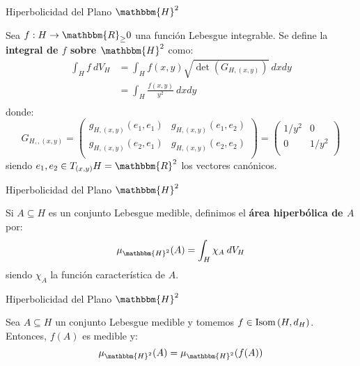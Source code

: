 \documentclass[xcolor=dvipsnames]{beamer}
\theoremstyle{largebreak}
\newcommand\cf[3]{\ensuremath{#1:#2\rightarrow#3}}
\newcommand{\bbm}[1]{\ensuremath{\mathbbm{#1}}}
\newcommand{\Isom}[1]{\ensuremath{\textup{Isom}\left(#1\right)}}
\begin{document}
\begin{frame}{Hiperbolicidad del Plano $\bbm{H}^2$}
    \begin{mydef}
        Sea $\cf{f}{H}{\bbm{R}_\geq0}$ una función Lebesgue integrable. Se define la \textbf{integral de $f$ sobre $\bbm{H}^2$} como:
        \begin{equation*}
            \begin{split}
                \int_{H}f\:dV_H&=\int_{H}f(x,y)\sqrt{\det(G_{H,(x,y)})}\:dxdy\\
                &=\int_{H}\frac{f(x,y)}{y^2}\:dxdy\\
            \end{split}
        \end{equation*}
        donde:
        \begin{equation*}
            G_{ H,,(x,y)}=\left(\begin{array}{cc}
                g_{ H,(x,y)}(e_1,e_1) & g_{ H,(x,y)}(e_1,e_2) \\
                g_{ H,(x,y)}(e_2,e_1) & g_{ H,(x,y)}(e_2,e_2) \\
            \end{array} \right)=\left(\begin{array}{cc}
                1/y^2 & 0 \\
                0 & 1/y^2 \\
            \end{array} \right)
        \end{equation*}
        siendo $e_1,e_2\in T_{(x,y)}H=\bbm{R}^2$ los vectores canónicos.
    \end{mydef}
\end{frame}

\begin{frame}{Hiperbolicidad del Plano $\bbm{H}^2$}
    \begin{mydef}
        Si $A\subseteq H$ es un conjunto Lebesgue medible, definimos el \textbf{área hiperbólica de $A$} por:
        \begin{equation*}
            \mu_{\bbm{H}^2}(A)=\int_{H}\chi_A\:dV_H
        \end{equation*}
        siendo $\chi_A$ la función característica de $A$.
    \end{mydef}
\end{frame}

\begin{frame}{Hiperbolicidad del Plano $\bbm{H}^2$}
    \begin{propo}
        Sea $A\subseteq H$ un conjunto Lebesgue medible y tomemos $f\in\Isom{H,d_H}$. Entonces, $f(A)$ es medible y:
        \begin{equation*}
            \mu_{\bbm{H}^2}(A)=\mu_{\bbm{H}^2}(f(A))
        \end{equation*}
    \end{propo}
\end{frame}
\end{document}
